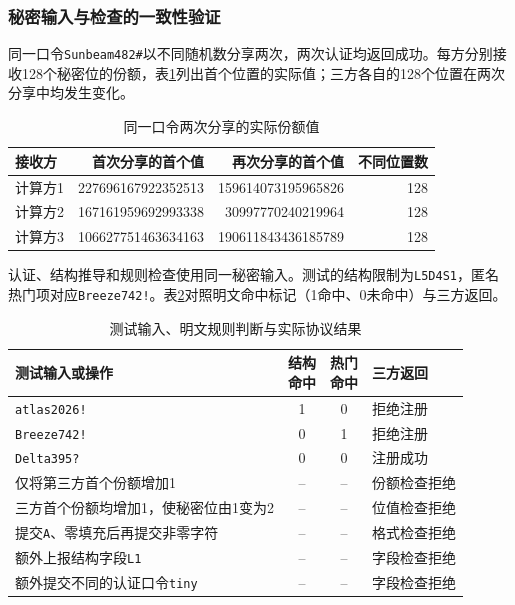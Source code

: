 \documentclass{crypto_report}
\begin{document}
\subsubsection{秘密输入与检查的一致性验证}\label{sec:validation-privacy-2}

同一口令\texttt{Sunbeam482\#}以不同随机数分享两次，两次认证均返回成功。每方分别接收128个秘密位的份额，表\ref{tab:privacy-share-values}列出首个位置的实际值；三方各自的128个位置在两次分享中均发生变化。

\begin{table}[H]
\centering
\caption{同一口令两次分享的实际份额值}\label{tab:privacy-share-values}
\small
\begin{tabular}{@{}lrrr@{}}
\toprule
接收方 & 首次分享的首个值 & 再次分享的首个值 & 不同位置数 \\
\midrule
计算方1 & 227696167922352513 & 159614073195965826 & 128 \\
计算方2 & 167161959692993338 & 30997770240219964 & 128 \\
计算方3 & 106627751463634163 & 190611843436185789 & 128 \\
\bottomrule
\end{tabular}
\end{table}

认证、结构推导和规则检查使用同一秘密输入。测试的结构限制为\texttt{L5D4S1}，匿名热门项对应\texttt{Breeze742!}。表\ref{tab:privacy-protocol-checks}对照明文命中标记（1命中、0未命中）与三方返回。

\begin{table}[H]
\centering
\caption{测试输入、明文规则判断与实际协议结果}\label{tab:privacy-protocol-checks}
\small
\begin{tabularx}{\linewidth}{@{}Xcc l@{}}
\toprule
测试输入或操作 & \shortstack{结构\\命中} & \shortstack{热门\\命中} & 三方返回 \\
\midrule
\texttt{atlas2026!} & 1 & 0 & 拒绝注册 \\
\texttt{Breeze742!} & 0 & 1 & 拒绝注册 \\
\texttt{Delta395?} & 0 & 0 & 注册成功 \\
仅将第三方首个份额增加1 & -- & -- & 份额检查拒绝 \\
三方首个份额均增加1，使秘密位由1变为2 & -- & -- & 位值检查拒绝 \\
提交\texttt{A}、零填充后再提交非零字符 & -- & -- & 格式检查拒绝 \\
额外上报结构字段\texttt{L1} & -- & -- & 字段检查拒绝 \\
额外提交不同的认证口令\texttt{tiny} & -- & -- & 字段检查拒绝 \\
\bottomrule
\end{tabularx}
\end{table}
\end{document}
